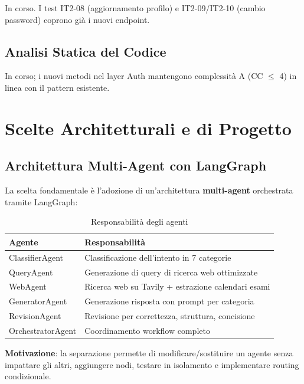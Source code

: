 \documentclass[a4paper,12pt]{report}
\begin{document}
In corso. I test IT2-08 (aggiornamento profilo) e IT2-09/IT2-10 (cambio password) coprono già i nuovi endpoint.

\section{Analisi Statica del Codice}

In corso; i nuovi metodi nel layer Auth mantengono complessità A (CC $\leq$ 4) in linea con il pattern esistente.


\chapter{Scelte Architetturali e di Progetto}

\section{Architettura Multi-Agent con LangGraph}

La scelta fondamentale è l'adozione di un'architettura \textbf{multi-agent} orchestrata tramite LangGraph:

\begin{table}[H]
\centering
\begin{tabularx}{\textwidth}{l X}
\toprule
\textbf{Agente} & \textbf{Responsabilità} \\
\midrule
ClassifierAgent & Classificazione dell'intento in 7 categorie \\
QueryAgent & Generazione di query di ricerca web ottimizzate \\
WebAgent & Ricerca web su Tavily + estrazione calendari esami \\
GeneratorAgent & Generazione risposta con prompt per categoria \\
RevisionAgent & Revisione per correttezza, struttura, concisione \\
OrchestratorAgent & Coordinamento workflow completo \\
\bottomrule
\end{tabularx}
\caption{Responsabilità degli agenti}
\end{table}

\textbf{Motivazione}: la separazione permette di modificare/sostituire un agente senza impattare gli altri, aggiungere nodi, testare in isolamento e implementare routing condizionale.
\end{document}
